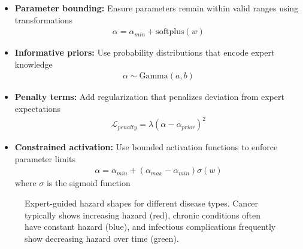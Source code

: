 \begin{itemize}
    \item \textbf{Parameter bounding:} Ensure parameters remain within valid ranges using transformations
    \begin{align}
        \alpha = \alpha_{min} + \text{softplus}(w)
    \end{align}

    \item \textbf{Informative priors:} Use probability distributions that encode expert knowledge
    \begin{align}
        \alpha \sim \text{Gamma}(a, b)
    \end{align}

    \item \textbf{Penalty terms:} Add regularization that penalizes deviation from expert expectations
    \begin{align}
        \mathcal{L}_{penalty} = \lambda(\alpha - \alpha_{prior})^2
    \end{align}

    \item \textbf{Constrained activation:} Use bounded activation functions to enforce parameter limits
    \begin{align}
        \alpha = \alpha_{min} + (\alpha_{max} - \alpha_{min})\sigma(w)
    \end{align}
    where $\sigma$ is the sigmoid function
\end{itemize}

\begin{figure}[htbp]
    \centering
    \caption{Expert-guided hazard shapes for different disease types. Cancer typically shows increasing hazard (red), chronic conditions often have constant hazard (blue), and infectious complications frequently show decreasing hazard over time (green).}
    \label{fig:expert-hazard-shapes}
\end{figure}

